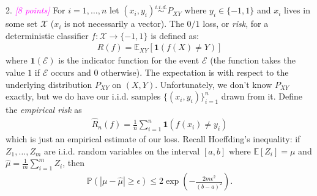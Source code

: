 \documentclass{article}
\newcommand{\1}{\mathbf{1}}
\newcommand{\E}{\mathbb{E}} %
\renewcommand{\P}{\mathbb{P}} %
\newcommand{\grade}[1]{\small\textcolor{magenta}{\emph{[#1 points]}} \normalsize}
\begin{document}
2. \grade{8} 
For $i=1,\dots,n$ let $(x_i,y_i) \overset{i.i.d.}{\sim} P_{XY}$ where $y_i \in \{-1,1\}$ and $x_i$ lives in some set $\mathcal{X}$ ($x_i$ is not necessarily a vector). 
The $0/1$ loss, or \emph{risk}, for a deterministic classifier $f:\mathcal{X} \rightarrow \{ -1,1 \}$ is defined as:
\begin{align*}
R(f) = \mathbb E_{XY} [\1(f(X)\neq Y)]
\end{align*}
where $\1(\mathcal{E})$ is the indicator function for the event $\mathcal{E}$ (the
function takes the value $1$ if $\mathcal{E}$ occurs and $0$ otherwise).
The expectation is with respect to the underlying distribution $P_{XY}$ on $(X,Y)$.
Unfortunately, we don't know $P_{XY}$ exactly, but we do have our i.i.d. samples $\{(x_i,y_i)\}_{i=1}^n$ drawn from it.
Define the \emph{empirical risk} as 
\begin{align*}
\widehat R_n(f) = \frac{1}{n} \sum_{i=1}^n \mathbf{1}(f(x_i)\neq y_i) 
\end{align*}
which is just an empirical estimate of our loss.
Recall Hoeffding's inequality: if $Z_1,\dots,Z_m$ are i.i.d. random variables on the interval $[a,b]$ where $\E[Z_i] = \mu$ and $\widehat{\mu} = \frac{1}{m} \sum_{i=1}^m Z_i$, then 
\begin{align*}
\P\left( |\mu - \widehat{\mu}| \geq \epsilon \right) \leq 2 \exp\left(- \frac{2 m \epsilon^2}{(b-a)^2}\right).
\end{align*}
\end{document}

